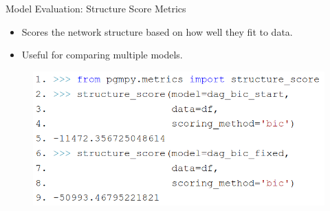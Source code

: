 \documentclass[aspectratio=169]{beamer}
\begin{document}
\begin{frame}{Model Evaluation: Structure Score Metrics}
	\begin{itemize}
		\item Scores the network structure based on how well they fit to data.
		\item Useful for comparing multiple models.
	\end{itemize}
	\vspace{1em}
	\begin{figure}
		\includegraphics[scale=0.3]{imgs/structure_score.png}
	\end{figure}
\end{frame}

% 	
% 
% 


% 
\end{document}
